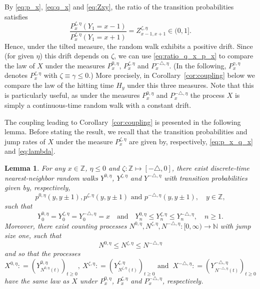 \documentclass[12pt,reqno,oneside]{amsart}
\numberwithin{equation}{section}
\newtheorem{lemma}[theorem]{Lemma}
\theoremstyle{definition}
\theoremstyle{remark}
\newcommand{\N}{\mathbb{N}}
\newcommand{\Z}{\mathbb{Z}}
\begin{document}
By \eqref{eq:p_x}, \eqref{eq:q_x} and \eqref{eq:Zxy}, the ratio of the
transition probabilities satisfies
\begin{equation}\label{eq:ratio_q_x_p_x}
  \frac{P_x^{\zeta,\eta}(Y_1=x-1)}{P_x^{\zeta,\eta}(Y_1=x+1)}
  = Z_{x-1,x+1}^{\zeta,\eta} \in (0,1].
\end{equation}
Hence, under the tilted measure, the random walk exhibits a positive drift.
Since (for given $\eta$) this drift depends on $\zeta$, we can use
\eqref{eq:ratio_q_x_p_x} to compare the law of $X$ under the measures
$P_x^{0,\eta}$, $P_x^{\zeta,\eta}$ and $P_x^{-\triangle, \eta} $. (In the
  following,  $P_x^{\gamma, \eta}$ denotes $P_x^{\zeta, \eta}$ with
  $\zeta \equiv \gamma \leq 0$.) More precisely, in
Corollary~\ref{cor:coupling} below we compare the law of the hitting time
$H_y$ under this three measures. Note that this is particularly useful, as
under the measures $P_x^{0, \eta}$ and $P_x^{-\triangle, \eta}$ the process $X$ is simply a
continuous-time random walk with a constant drift.

The coupling leading to Corollary~\ref{cor:coupling} is presented in the
following lemma. Before stating the result, we recall that the transition
probabilities and jump rates of $X$ under the measure $P_x^{\zeta, \eta}$ are
given by, respectively, \eqref{eq:p_x_q_x} and \eqref{eq:lambda}.

\begin{lemma}
  \label{lemma:coupling}
  For any $x \in \Z$, $\eta \leq 0$ and
  $ \zeta: \Z \mapsto [- \triangle, 0]$, there exist discrete-time
  nearest-neighbor random walks $Y^{0, \eta}$, $Y^{\zeta, \eta}$ and
  $Y^{-\triangle, \eta}$ with transition probabilities given by, respectively,
  \begin{equation*}
    p^{0,\eta}(y,y\pm1),p^{\zeta,\eta} (y,y\pm1) \text{ and } p^{- \triangle,\eta}(y,y\pm1), \quad y \in \Z,
  \end{equation*}
  such that
  \begin{equation}\label{eq:coupling_Y}
    Y^{0, \eta}_0 = Y^{\zeta, \eta}_0
    = Y^{ - \triangle, \eta}_0=x
    \quad \text{and} \quad
    Y^{0, \eta}_n \leq Y^{\zeta, \eta}_n
    \leq Y^{ - \triangle, \eta}_n,  \quad n \geq 1.
  \end{equation}
  Moreover, there exist counting processes
  $N^{0,\eta},N^{\zeta, \eta},N^{- \triangle, \eta}:[0,\infty) \rightarrow
  \N$ with jump size one, such that
  \begin{equation}\label{eq:N}
    N^{0,\eta} \leq N^{\zeta, \eta}\leq N^{- \triangle, \eta}
  \end{equation}
  and so that the processes
  \begin{equation*}
    X^{0, \eta}:
    =\left(Y^{0, \eta}_{N^{0,\eta}(t)}\right)_{t \geq 0}, \ X^{\zeta, \eta}:
    =\left(Y^{\zeta, \eta}_{N^{\zeta,\eta}(t)}\right)_{t \geq 0}   \text{ and
    }\ X^{-\triangle, \eta}:
    =\left(Y^{-\triangle, \eta}_{N^{-\triangle,\eta}(t)}\right)_{t \geq 0}
  \end{equation*}
  have the
  same law as $X$ under $P_x^{0, \eta}$, $P_x^{\zeta, \eta}$
  and $P_x^{- \triangle, \eta}$, respectively.
\end{lemma}
\end{document}
